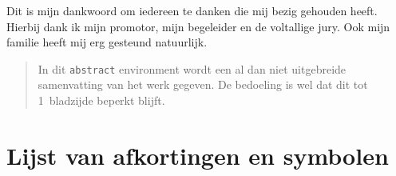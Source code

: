 \documentclass[master=cws,masteroption=ai]{kulemt}
\begin{document}
\begin{preface}
  Dit is mijn dankwoord om iedereen te danken die mij bezig gehouden heeft.
  Hierbij dank ik mijn promotor, mijn begeleider en de voltallige jury.
  Ook mijn familie heeft mij erg gesteund natuurlijk.
\end{preface}

\tableofcontents*

\begin{abstract}
  In dit \texttt{abstract} environment wordt een al dan niet uitgebreide
  samenvatting van het werk gegeven. De bedoeling is wel dat dit tot
  1~bladzijde beperkt blijft.

  \lipsum[1]
\end{abstract}

\listoffiguresandtables
\chapter{Lijst van afkortingen en symbolen}
\end{document}
